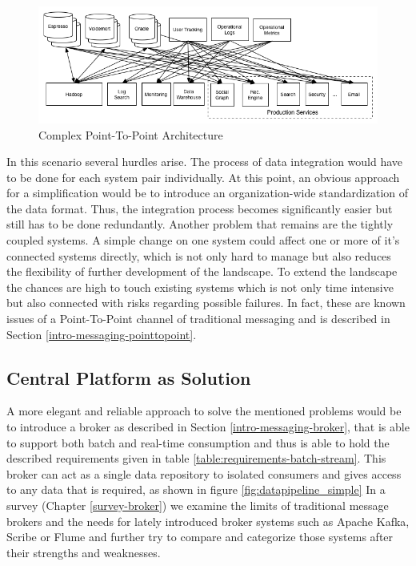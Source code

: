 \begin{figure}[H]
    \centering
    \includegraphics[width=1.0\textwidth]{images/datapipeline_complex.png}
    \caption{Complex Point-To-Point Architecture}
    \label{fig:datapipeline_complex}
\end{figure}

In this scenario several hurdles arise. The process of data integration would
have to be done for each system pair individually. At this point, an obvious
approach for a simplification would be to introduce an organization-wide
standardization of the data format. Thus, the integration process becomes 
significantly easier but still has to be done redundantly. Another problem that
remains are the tightly coupled systems. A simple change on one system could
affect one or more of it's connected systems directly, which is not only hard to
manage but also reduces the flexibility of further development of the landscape.
To extend the landscape the chances are high to touch existing systems which is
not only time intensive but also connected with risks regarding possible failures. In fact,
these are known issues of a Point-To-Point channel of traditional messaging and
is described in Section \ref{intro-messaging-pointtopoint}.

\subsection{Central Platform as Solution}
A more elegant and reliable approach to solve the mentioned problems would be to
introduce a broker as described in Section \ref{intro-messaging-broker}, that is 
able to support both batch and real-time consumption and thus is able to hold
the described requirements given in table \ref{table:requirements-batch-stream}. 
This broker can act as a single data repository to isolated consumers and gives
access to any data that is required, as shown in figure
\ref{fig:datapipeline_simple} In a survey (Chapter \ref{survey-broker}) we examine the limits of
traditional message brokers and the needs for lately introduced broker systems
such as Apache Kafka\cite{apachekafka}, Scribe\cite{scribe} or
Flume\cite{apacheflume} and further try to compare and categorize those
systems after their strengths and weaknesses.

